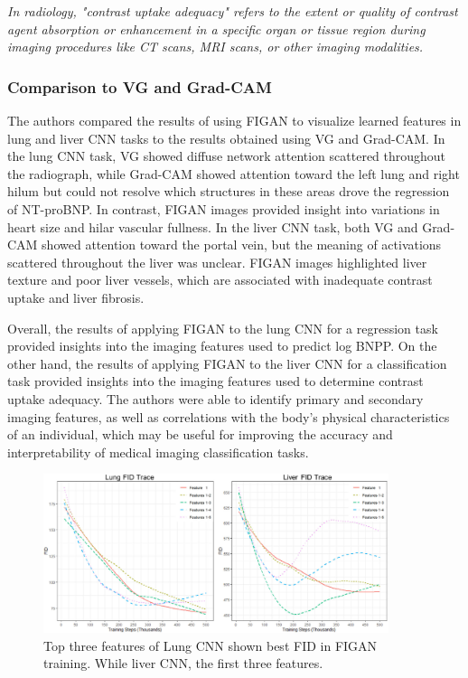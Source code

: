 \noindent
\textit{In radiology, "contrast uptake adequacy" refers to the extent or quality of contrast agent absorption or enhancement in a specific organ or tissue region during imaging procedures like CT scans, MRI scans, or other imaging modalities.}

\subsubsection{Comparison to VG and Grad-CAM}

The authors compared the results of using FIGAN to visualize learned features in lung and liver CNN tasks to the results obtained using VG and Grad-CAM. In the lung CNN task, VG showed diffuse network attention scattered throughout the radiograph, while Grad-CAM showed attention toward the left lung and right hilum but could not resolve which structures in these areas drove the regression of NT-proBNP. In contrast, FIGAN images provided insight into variations in heart size and hilar vascular fullness. In the liver CNN task, both VG and Grad-CAM showed attention toward the portal vein, but the meaning of activations scattered throughout the liver was unclear. FIGAN images highlighted liver texture and poor liver vessels, which are associated with inadequate contrast uptake and liver fibrosis.

\clearpage

\noindent
Overall, the results of applying FIGAN to the lung CNN for a regression task provided insights into the imaging features used to predict log BNPP. On the other hand, the results of applying FIGAN to the liver CNN for a classification task provided insights into the imaging features used to determine contrast uptake adequacy. The authors were able to identify primary and secondary imaging features, as well as correlations with the body's physical characteristics of an individual, which may be useful for improving the accuracy and interpretability of medical imaging classification tasks.

\begin{figure}[h!]
    \centering
    \includegraphics[width=0.9\textwidth]{Images/res_comp_graph.png}
    \caption[Plotted FID traces on applying FIGAN to lung and liver CNNs]{Top three features of Lung CNN shown best FID in FIGAN training. While liver CNN, the first three features.}
\end{figure}

